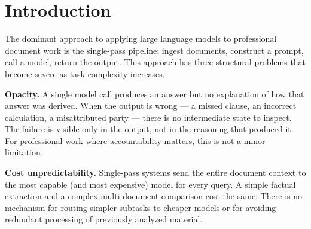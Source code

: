 \documentclass[11pt,a4paper]{article}
\begin{document}
\begin{abstract}
\noindent We present a swarm-based architecture for long-context document analysis that coordinates multiple AI agents through a shared, evolving blackboard. Unlike monolithic single-prompt approaches, the system decomposes tasks into planning, extraction, analysis, and synthesis phases — each producing structured, source-grounded state that can be inspected, debugged, and extended. We evaluate on the full 1,251-task Harvey Legal Agent Benchmark (LAB), achieving 83.74\% pooled criteria pass rate and 17.75\% strict all-pass at \$1.30 per task — delivering 98$\times$ more intelligence per dollar than Harvey's initial published result and 67$\times$ more than their strongest. We argue that the primary value of swarm coordination is not raw performance but three properties that monolithic systems cannot provide: full auditability of the reasoning process, predictable cost scaling, and the foundation for persistent cross-session learning that reduces marginal cost over time. We open-source the complete system, all benchmark outputs, and five annotated reasoning traces under the MIT license.
\end{abstract}

\vspace{1em}


\section{Introduction}

The dominant approach to applying large language models to professional document work is the single-pass pipeline: ingest documents, construct a prompt, call a model, return the output. This approach has three structural problems that become severe as task complexity increases.

\textbf{Opacity.} A single model call produces an answer but no explanation of how that answer was derived. When the output is wrong — a missed clause, an incorrect calculation, a misattributed party — there is no intermediate state to inspect. The failure is visible only in the output, not in the reasoning that produced it. For professional work where accountability matters, this is not a minor limitation.

\textbf{Cost unpredictability.} Single-pass systems send the entire document context to the most capable (and most expensive) model for every query. A simple factual extraction and a complex multi-document comparison cost the same. There is no mechanism for routing simpler subtasks to cheaper models or for avoiding redundant processing of previously analyzed material.
\end{document}
